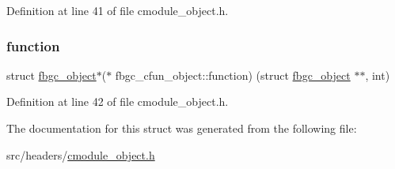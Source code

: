 Definition at line 41 of file cmodule\+\_\+object.\+h.

\mbox{\label{structfbgc__cfun__object_acc134ef71c8d93a607ed3b22f03b4f20}} 
\subsubsection{\texorpdfstring{function}{function}}
{\footnotesize\ttfamily struct \hyperlink{structfbgc__object}{fbgc\+\_\+object}$\ast$($\ast$  fbgc\+\_\+cfun\+\_\+object\+::function) (struct \hyperlink{structfbgc__object}{fbgc\+\_\+object} $\ast$$\ast$, int)}



Definition at line 42 of file cmodule\+\_\+object.\+h.



The documentation for this struct was generated from the following file\+:\begin{DoxyCompactItemize}
\item 
src/headers/\hyperlink{cmodule__object_8h}{cmodule\+\_\+object.\+h}\end{DoxyCompactItemize}
